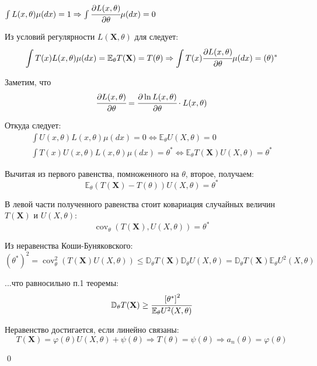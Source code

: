 \documentclass[oneside,final,14pt]{extreport}
\renewenvironment{proof}{{\bfseries Доказательство.}}{\qed}
\theoremstyle{plain}
\theoremstyle{definition}
\theoremstyle{named}
\begin{document}
\begin{proof}
$\int L(x, \theta) \mu(d x)=1 \Rightarrow \int \cfrac{\partial L(x, \theta)}{\partial \theta} \mu(d x)=0$

Из условий регулярности $L(\mathbf{X}, \theta)$ для следует:
\begin{equation*}
    \int T(x) L(x, \theta) \mu(d x)=\mathbb{E}_{\theta} T(\mathbf{X})=T(\theta) \Rightarrow \int T(x) \cfrac{\partial L(x, \theta)}{\partial \theta} \mu(d x)=(\theta)^{*}
\end{equation*}

Заметим, что
\begin{equation*}
    \cfrac{\partial L(x, \theta)}{\partial \theta}=\cfrac{\partial \ln L(x, \theta)}{\partial \theta} \cdot L(x, \theta)
\end{equation*}

Откуда следует:
\begin{gather*}
    \int U(x, \theta) L(x, \theta) \mu(d x)=0 \Leftrightarrow \mathbb{E}_{\theta} U(X, \theta)=0 \\
\int T(x) U(x, \theta) L(x, \theta) \mu(d x)=\theta^{*} \Leftrightarrow \mathbb{E}_{\theta} T(\mathbf{X}) U(X, \theta)=\theta^{*}
\end{gather*}

Вычитая из первого равенства, помноженного на $\theta$, второе, получаем:
\begin{equation*}
    \mathbb{E}_{\theta}(T(\mathbf{X})-T(\theta)) U(X, \theta)=\theta^{*}
\end{equation*}

В левой части полученного равенства стоит ковариация случайных величин $T(\mathbf{X})$ и $U(X,\theta)$:
\begin{equation*}
    \operatorname{cov}_{\theta}(T(\mathbf{X}), U(X, \theta))=\theta^{*}
\end{equation*}

Из неравенства Коши-Буняковского:
\begin{equation*}
    \left(\theta^{*}\right)^{2}=\operatorname{cov}_{\theta}^{2}(T(\mathbf{X}) U(X, \theta)) \leqslant \mathbb{D}_{\theta} T(\mathbf{X}) \mathbb{D}_{\theta} U(X, \theta)=\mathbb{D}_{\theta} T(\mathbf{X}) \mathbb{E}_{\theta} U^{2}(X, \theta)
\end{equation*}

...что равносильно п.1 теоремы:
\begin{equation*}
    \mathbb{D}_{\theta} T(\mathbf{X}) \geq \cfrac{\left[\theta^{*}\right]^{2}}{\mathbb{E}_{\theta} U^{2}(X, \theta)}
\end{equation*}

Неравенство достигается, если линейно связаны:
\begin{equation*}
    T(\mathbf{X})=\varphi(\theta) U(X, \theta)+\psi(\theta) \Rightarrow T(\theta)=\psi(\theta) \Rightarrow a_{n}(\theta)=\varphi(\theta)
\end{equation*}

\end{proof}
\end{document}
